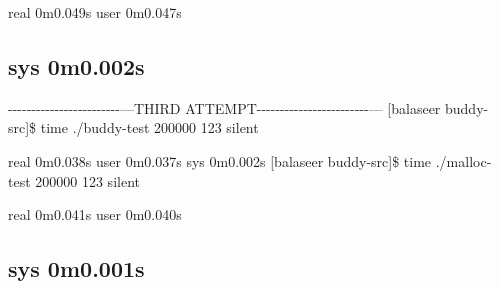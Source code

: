 real 0m0.\+049s user 0m0.\+047s \subsection*{sys 0m0.\+002s }

-\/-\/-\/-\/-\/-\/-\/-\/-\/-\/-\/-\/-\/-\/-\/-\/-\/-\/-\/-\/-\/-\/-\/-\/---T\+H\+I\+R\+D A\+T\+T\+E\+M\+P\+T-\/-\/-\/-\/-\/-\/-\/-\/-\/-\/-\/-\/-\/-\/-\/-\/-\/-\/-\/-\/-\/-\/-\/-\/--- \mbox{[}balaseer buddy-\/src\mbox{]}\$ time ./buddy-\/test 200000 123 silent

real 0m0.\+038s user 0m0.\+037s sys 0m0.\+002s \mbox{[}balaseer buddy-\/src\mbox{]}\$ time ./malloc-\/test 200000 123 silent

real 0m0.\+041s user 0m0.\+040s \subsection*{sys 0m0.\+001s }